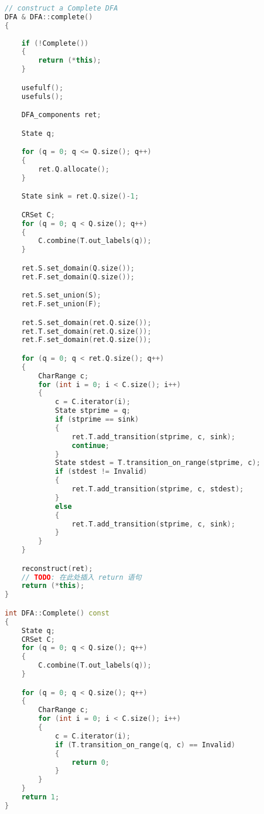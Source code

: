 \begin{lstlisting}[language=C++,label={lst:complete-imp},caption={文件 DFA.cpp}]
// construct a Complete DFA
DFA & DFA::complete()
{
    
    if (!Complete())
    {
        return (*this);
    }

    usefulf();
    usefuls();

    DFA_components ret;

    State q;

    for (q = 0; q <= Q.size(); q++)
    {
        ret.Q.allocate();
    }

    State sink = ret.Q.size()-1;

    CRSet C;
    for (q = 0; q < Q.size(); q++)
    {
        C.combine(T.out_labels(q));
    }

    ret.S.set_domain(Q.size());
    ret.F.set_domain(Q.size());

    ret.S.set_union(S);
    ret.F.set_union(F);

    ret.S.set_domain(ret.Q.size());
    ret.T.set_domain(ret.Q.size());
    ret.F.set_domain(ret.Q.size());

    for (q = 0; q < ret.Q.size(); q++)
    {
        CharRange c;
        for (int i = 0; i < C.size(); i++)
        {
            c = C.iterator(i);
            State stprime = q;
            if (stprime == sink)
            {
                ret.T.add_transition(stprime, c, sink);
                continue;
            }
            State stdest = T.transition_on_range(stprime, c);
            if (stdest != Invalid)
            {
                ret.T.add_transition(stprime, c, stdest);
            }
            else
            {
                ret.T.add_transition(stprime, c, sink);
            }
        }
    }

    reconstruct(ret);
    // TODO: 在此处插入 return 语句
    return (*this);
}

int DFA::Complete() const
{
    State q;
    CRSet C;
    for (q = 0; q < Q.size(); q++)
    {
        C.combine(T.out_labels(q));
    }

    for (q = 0; q < Q.size(); q++)
    {
        CharRange c;
        for (int i = 0; i < C.size(); i++)
        {
            c = C.iterator(i);
            if (T.transition_on_range(q, c) == Invalid)
            {
                return 0;
            }
        }
    }
    return 1;
}
\end{lstlisting}